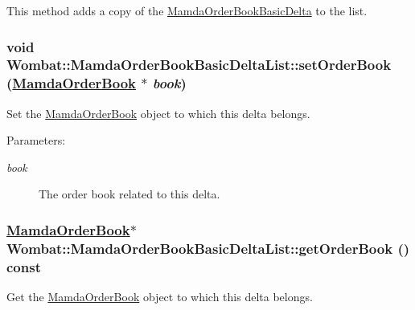 This method adds a copy of the \hyperlink{classWombat_1_1MamdaOrderBookBasicDelta}{Mamda\-Order\-Book\-Basic\-Delta} to the list. \hypertarget{classWombat_1_1MamdaOrderBookBasicDeltaList_5ce79be2d4416c566075681ff0fb30f8}{
\subsubsection[setOrderBook]{\setlength{\rightskip}{0pt plus 5cm}void Wombat::Mamda\-Order\-Book\-Basic\-Delta\-List::set\-Order\-Book (\hyperlink{classWombat_1_1MamdaOrderBook}{Mamda\-Order\-Book} $\ast$ {\em book})}}
\label{classWombat_1_1MamdaOrderBookBasicDeltaList_5ce79be2d4416c566075681ff0fb30f8}


Set the \hyperlink{classWombat_1_1MamdaOrderBook}{Mamda\-Order\-Book} object to which this delta belongs. 

\begin{Desc}
\item[Parameters:]
\begin{description}
\item[{\em book}]The order book related to this delta. \end{description}
\end{Desc}
\hypertarget{classWombat_1_1MamdaOrderBookBasicDeltaList_9172d0229dad18ba085e57cf9ccad404}{
\subsubsection[getOrderBook]{\setlength{\rightskip}{0pt plus 5cm}\hyperlink{classWombat_1_1MamdaOrderBook}{Mamda\-Order\-Book}$\ast$ Wombat::Mamda\-Order\-Book\-Basic\-Delta\-List::get\-Order\-Book () const}}
\label{classWombat_1_1MamdaOrderBookBasicDeltaList_9172d0229dad18ba085e57cf9ccad404}


Get the \hyperlink{classWombat_1_1MamdaOrderBook}{Mamda\-Order\-Book} object to which this delta belongs. 

